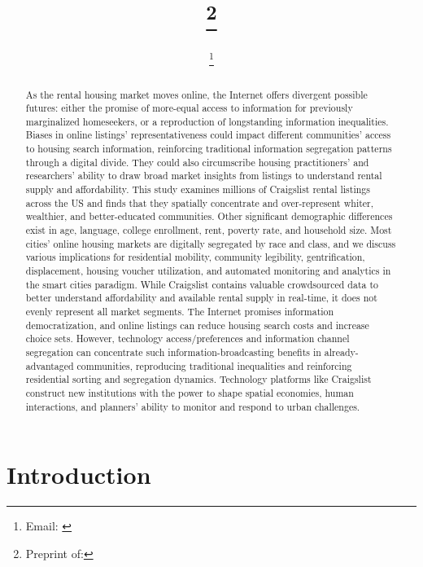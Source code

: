 \documentclass[11pt,letterpaper]{article}
\begin{document}
\title{\papertitle\footnote{{Preprint of: \papercitation}}}
\author[]{\myname\footnote{Email: \href{mailto:\myemail}{\myemail}}}
\date{\paperdate}

\maketitle

\begin{abstract}
As the rental housing market moves online, the Internet offers divergent possible futures: either the promise of more-equal access to information for previously marginalized homeseekers, or a reproduction of longstanding information inequalities. Biases in online listings' representativeness could impact different communities' access to housing search information, reinforcing traditional information segregation patterns through a digital divide. They could also circumscribe housing practitioners' and researchers' ability to draw broad market insights from listings to understand rental supply and affordability. This study examines millions of Craigslist rental listings across the US and finds that they spatially concentrate and over-represent whiter, wealthier, and better-educated communities. Other significant demographic differences exist in age, language, college enrollment, rent, poverty rate, and household size. Most cities' online housing markets are digitally segregated by race and class, and we discuss various implications for residential mobility, community legibility, gentrification, displacement, housing voucher utilization, and automated monitoring and analytics in the smart cities paradigm. While Craigslist contains valuable crowdsourced data to better understand affordability and available rental supply in real-time, it does not evenly represent all market segments. The Internet promises information democratization, and online listings can reduce housing search costs and increase choice sets. However, technology access/preferences and information channel segregation can concentrate such information-broadcasting benefits  in already-advantaged communities, reproducing traditional inequalities and reinforcing residential sorting and segregation dynamics. Technology platforms like Craigslist construct new institutions with the power to shape spatial economies, human interactions, and planners' ability to monitor and respond to urban challenges.
\vfill
\end{abstract}


\section{Introduction}
\end{document}
